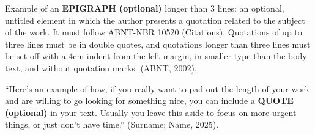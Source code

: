 
\vspace*{10cm}
\begin{citacao}
Example of an \textbf{EPIGRAPH (optional)} longer than 3 lines: an optional, untitled element in which the author presents a quotation related to the subject of the work. It must follow ABNT-NBR 10520 (Citations). Quotations of up to three lines must be in double quotes, and quotations longer than three lines must be set off with a 4cm indent from the left margin, in smaller type than the body text, and without quotation marks. (ABNT, 2002).
\end{citacao}

    \vspace*{5cm}

		\enquote{Here's an example of how, if you really want to pad out the length of your work and are willing to go looking for something nice, you can include a \textbf{QUOTE (optional)} in your text. Usually you leave this aside to focus on more urgent things, or just don't have time.} (Surname; Name, 2025).

\newpage
